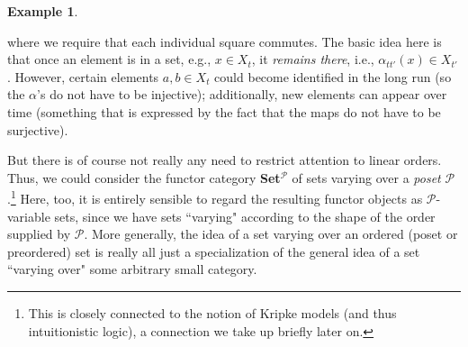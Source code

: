 \documentclass[a4paper]{book}
\theoremstyle{definition}
\newtheorem{example}{Example}[section]
\theoremstyle{definition}
\theoremstyle{definition}
\theoremstyle{theorem}
\theoremstyle{definition}
\begin{document}
\begin{example}
\begin{center}
		\end{center} 
		where we require that each individual square commutes. The basic idea here is that once an element is in a set, e.g., $ x \in X_t$, it \textit{remains there}, i.e., $\alpha_{tt'}(x) \in X_{t'}$. However, certain elements $a, b \in X_t$ could become identified in the long run (so the $\alpha$'s do not have to be injective); additionally, new elements can appear over time (something that is expressed by the fact that the maps do not have to be surjective). \par 
		But there is of course not really any need to restrict attention to linear orders. Thus, we could consider the functor category \textbf{Set}$^{\mathcal{P}}$ of sets varying over a \textit{poset} $\mathcal{P}$.\footnote{This is closely connected to the notion of Kripke models (and thus intuitionistic logic), a connection we take up briefly later on.} Here, too, it is entirely sensible to regard the resulting functor objects as $\mathcal{P}$-variable sets, since we have sets ``varying" according to the shape of the order supplied by $\mathcal{P}$. More generally, the idea of a set varying over an ordered (poset or preordered) set is really all just a specialization of the general idea of a set ``varying over" some arbitrary small category. 
	\end{example}
\end{document}
